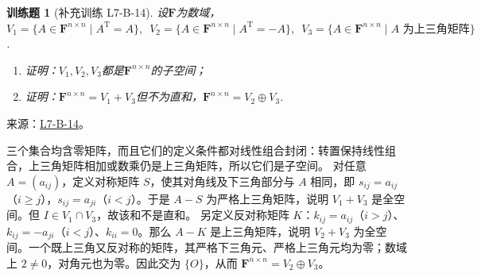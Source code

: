 \documentclass[12pt,fontset=fandol]{ctexart}
\newtheorem{exercise}{训练题}[section]
\begin{document}
\begin{exercise}[补充训练 L7-B-14]\label{prob:L7-B-14}
设$\mathbf{F}$为数域，$V_1=\{A\in\mathbf{F}^{n\times n} \mid A^\mathrm{T}=A\},\enspace
            V_2=\{A\in\mathbf{F}^{n\times n} \mid A^\mathrm{T}=-A\},\enspace V_3=\{A\in\mathbf{F}^{n\times n} \mid A\text{~为上三角矩阵}\}$.
        \begin{enumerate}
            \item 证明：$V_1,V_2,V_3$都是$\mathbf{F}^{n\times n}$的子空间；

            \item 证明：$\mathbf{F}^{n\times n}=V_1+V_3$但不为直和，$\mathbf{F}^{n\times n}=V_2\oplus V_3$.
        \end{enumerate}
\end{exercise}
\noindent 来源：\href{https://github.com/yhwu-is/Linear-Algebra-Left-Undone/blob/new/%E8%AE%B2%E4%B9%89/%E4%B8%93%E9%A2%98/7%20%E7%BA%BF%E6%80%A7%E6%98%A0%E5%B0%84%E7%9F%A9%E9%98%B5%E8%A1%A8%E7%A4%BA%E4%B8%8E%E7%9F%A9%E9%98%B5%E8%BF%90%E7%AE%97%E5%9F%BA%E7%A1%80.tex}{L7-B-14}。
\begin{solve}
三个集合均含零矩阵，而且它们的定义条件都对线性组合封闭：转置保持线性组合，上三角矩阵相加或数乘仍是上三角矩阵，所以它们是子空间。
对任意 $A=(a_{ij})$，定义对称矩阵 $S$，使其对角线及下三角部分与 $A$ 相同，即 $s_{ij}=a_{ij}$（$i\ge j$），$s_{ij}=a_{ji}$（$i<j$）。于是 $A-S$ 为严格上三角矩阵，说明 $V_1+V_3$ 是全空间。但 $I\in V_1\cap V_3$，故该和不是直和。
另定义反对称矩阵 $K$：$k_{ij}=a_{ij}$（$i>j$）、$k_{ij}=-a_{ji}$（$i<j$）、$k_{ii}=0$。那么 $A-K$ 是上三角矩阵，说明 $V_2+V_3$ 为全空间。一个既上三角又反对称的矩阵，其严格下三角元、严格上三角元均为零；数域上 $2\ne0$，对角元也为零。因此交为 $\{O\}$，从而 $\mathbf F^{n\times n}=V_2\oplus V_3$。
\end{solve}
\end{document}
